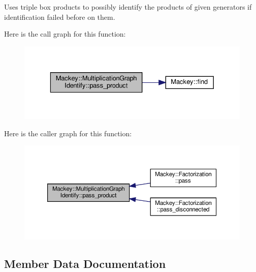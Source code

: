 Uses triple box products to possibly identify the products of given generators if identification failed before on them. 

Here is the call graph for this function\+:\nopagebreak
\begin{figure}[H]
\begin{center}
\leavevmode
\includegraphics[width=329pt]{classMackey_1_1MultiplicationGraphIdentify_af3019970f4431d1930f75418fb134441_cgraph}
\end{center}
\end{figure}
Here is the caller graph for this function\+:\nopagebreak
\begin{figure}[H]
\begin{center}
\leavevmode
\includegraphics[width=350pt]{classMackey_1_1MultiplicationGraphIdentify_af3019970f4431d1930f75418fb134441_icgraph}
\end{center}
\end{figure}


\subsection{Member Data Documentation}
\mbox{\label{classMackey_1_1MultiplicationGraphIdentify_a8356b59250ebac1ac30ebc7407bd352b}} 
